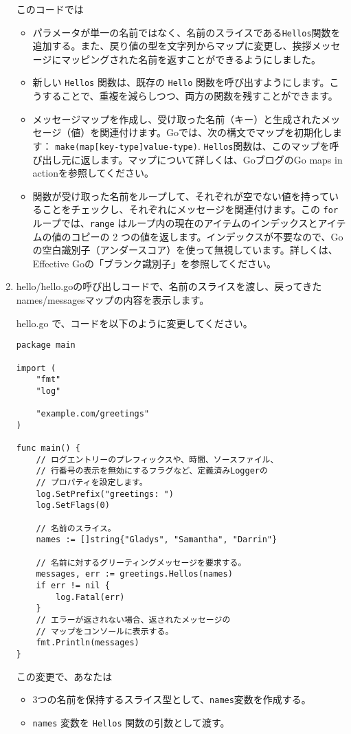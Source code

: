 \begin{enumerate}
このコードでは
\begin{itemize}
\item パラメータが単一の名前ではなく、名前のスライスである\texttt{Hellos}関数を追加する。また、戻り値の型を文字列からマップに変更し、挨拶メッセージにマッピングされた名前を返すことができるようにしました。
\item 新しい \texttt{Hellos} 関数は、既存の \texttt{Hello} 関数を呼び出すようにします。こうすることで、重複を減らしつつ、両方の関数を残すことができます。
\item メッセージマップを作成し、受け取った名前（キー）と生成されたメッセージ（値）を関連付けます。Goでは、次の構文でマップを初期化します： \texttt{make(map[key-type]value-type)}. \texttt{Hellos}関数は、このマップを呼び出し元に返します。マップについて詳しくは、GoブログのGo maps in actionを参照してください。
\item 関数が受け取った名前をループして、それぞれが空でない値を持っていることをチェックし、それぞれにメッセージを関連付けます。この \texttt{for} ループでは、\texttt{range} はループ内の現在のアイテムのインデックスとアイテムの値のコピーの 2 つの値を返します。インデックスが不要なので、Goの空白識別子（アンダースコア）を使って無視しています。詳しくは、Effective Goの「ブランク識別子」を参照してください。
\end{itemize}

\item hello/hello.goの呼び出しコードで、名前のスライスを渡し、戻ってきたnames/messagesマップの内容を表示します。

hello.go で、コードを以下のように変更してください。


\begin{lstlisting}[numbers=none]
package main

import (
    "fmt"
    "log"

    "example.com/greetings"
)

func main() {
    // ログエントリーのプレフィックスや、時間、ソースファイル、
    // 行番号の表示を無効にするフラグなど、定義済みLoggerの
    // プロパティを設定します。
    log.SetPrefix("greetings: ")
    log.SetFlags(0)

    // 名前のスライス。
    names := []string{"Gladys", "Samantha", "Darrin"}

    // 名前に対するグリーティングメッセージを要求する。
    messages, err := greetings.Hellos(names)
    if err != nil {
        log.Fatal(err)
    }
    // エラーが返されない場合、返されたメッセージの
    // マップをコンソールに表示する。
    fmt.Println(messages)
}
\end{lstlisting}
この変更で、あなたは
\begin{itemize}
\item 3つの名前を保持するスライス型として、\texttt{names}変数を作成する。
\item \texttt{names} 変数を \texttt{Hellos} 関数の引数として渡す。
\end{itemize}


\end{enumerate}
